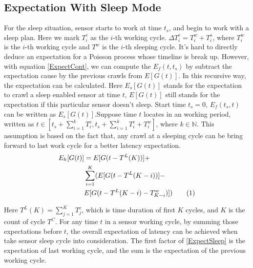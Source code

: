 \documentclass[conference]{IEEEtran}
\newcommand\numberthis{\addtocounter{equation}{1}\tag{\theequation}}
\begin{document}
\subsection{Expectation With Sleep Mode}
For the sleep situation, sensor starts to work at time $t_s$, and begin to work with a sleep plan.
Here we mark $T^{c}_{i}$ as the $i$-th working cycle. $\Delta T^{c}_{i} = T^{w}_{i}+T^{s}_{i}$, where $T^{w}_{i}$ is the $i$-th working cycle and $T^{w}$ is the $i$-th sleeping cycle. 
It's hard to directly deduce an expectation for a Poisson process whose timeline is break up. However, with equation \eqref{ExpectCont}, we can compute the $E_f(t, t_s)$ by subtract the expectation cause by the previous crawls from $E[G(t)]$. In this recursive way, the expectation can be calculated. Here $E_s[G(t)]$ stands for the expectation to crawl a sleep enabled sensor at time $t$, $E[G(t)]$ still stands for the expectation if this particular sensor doesn't sleep.
Start time $t_s=0$, $E_f(t_s,t)$ can be written as $E_s[G(t)]$.Suppose time $t$ locates in an working period, written as $t \in [t_s + \sum_{i=1}^{k} T^{c}_{i}, t_s + \sum_{i=1}^{k} T^{c}_{i} + T^{w}_{i}]$, where $k\in\mathbb{N}$. This assumption is based on the fact that, any crawl at a sleeping cycle can be bring forward to last work cycle for a better latency expectation.
\begin{align*}
E_h[G(t)] & = E[G(t-T^{L}(K))] + \\
	& \sum_{i=1}^{K}(E[G(t-T^{L}(K-i))]-\\
	& E[G(t-T^{L}(K-i)-T^{w}_{K-i})]) \numberthis \label{ExpectSleep}
\end{align*}

Here $T^{L}(K) = \sum_{j=1}^{K} T^{c}_{j}$, which is time duration of first $K$ cycles, and $K$ is the count of cycle $T^{C}$. 
For any time $t$ in a sensor working cycle, by summing those expectations before $t$, the overall expectation of latency can be achieved when take sensor sleep cycle into consideration. The first factor of \eqref{ExpectSleep} is the expectation of last working cycle, and the sum is the expectation of the previous working cycle.
\end{document}
